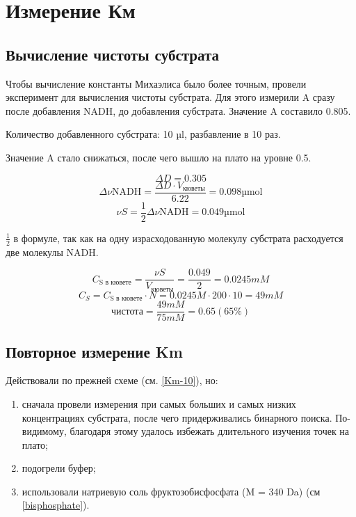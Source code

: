 \section{Измерение Км}

\subsection{Вычисление чистоты субстрата}
Чтобы вычисление константы Михаэлиса было более точным, провели
эксперимент для вычисления чистоты субстрата.
Для этого измерили A сразу после добавления NADH, до добавления субстрата.
Значение A составило 0.805.

Количество добавленного субстрата: 10 µl, разбавление в 10 раз.

Значение A стало снижаться, после чего вышло на плато на уровне 0.5.

$$ \Delta D = 0.305 $$
$$ \Delta \nu\text{NADH} = \frac{\Delta D \cdot V_\text{кюветы}}{6.22} = 0.098 \text{µmol} $$
$$ \nu S = \frac{1}{2} \Delta \nu\text{NADH} = 0.049 \text{µmol} $$

$\frac{1}{2}$ в формуле, так как на одну израсходованную молекулу субстрата
расходуется две молекулы NADH.

$$ C_\text{S в кювете} = \frac{\nu S}{V_\text{кюветы}} = \frac{0.049}{2} = 0.0245 mM $$
$$ C_S = C_\text{S в кювете} \cdot N = 0.0245 M \cdot 200 \cdot 10 = 49 mM $$
$$ \text{чистота} = \frac{49 mM}{75 mM} = 0.65 (65 \%) $$

\subsection{Повторное измерение Km}
Действовали по прежней схеме (см. \ref{Km-10}), но:
\begin{enumerate}
\item сначала провели измерения при самых больших и самых низких концентрациях субстрата,
    после чего придерживались бинарного поиска.
    По-видимому, благодаря этому удалось избежать длительного изучения точек на плато;
\item подогрели буфер;
\item использовали натриевую соль фруктозобисфосфата (M = 340 Da) (см \ref{bisphosphate}).
\end{enumerate}

